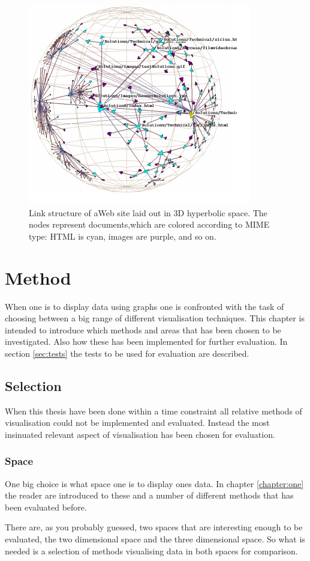 \documentclass[a4paper,11pt]{kth-mag}
\begin{document}
 \begin{figure}[!htbp]
	\centering
	\includegraphics{HyperBolicEx1}
	\caption{Link structure of aWeb site laid out in 3D hyperbolic space. The nodes represent documents,which are colored
according to MIME type: HTML is cyan, images are purple, and so on.}
	\label{fig:hyperbolic_example}
\end{figure}
\chapter{Method}
When one is to display data using graphs one is confronted with the task of choosing between a big range of different visualisation techniques.
This chapter is intended to introduce which methods and areas that has been chosen to be investigated. Also how these has been implemented for 
further evaluation. In section \ref{sec:tests} the tests to be used for evaluation are described.
\section{Selection}
When this thesis have been done within a time constraint all relative methods of visualisation could not be implemented and evaluated. 
Instead the most insinuated relevant aspect of visualisation has been chosen for evaluation.
\subsection{Space}
One big choice is what space one is to display ones data. In chapter \ref{chapter:one} the reader are introduced to these and a number of 
different methods that has been evaluated before. 

There are, as you probably guessed, two spaces that are interesting enough to be evaluated, the two dimensional space and the three dimensional space.
So what is needed is a selection of methods visualising data in both spaces for comparison.
\end{document}
